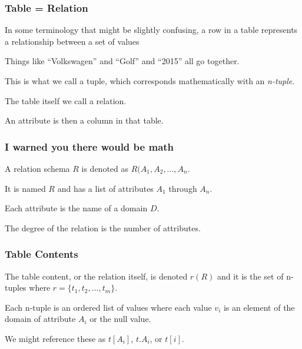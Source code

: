 \begin{frame}
\frametitle{Table = Relation}

In some terminology that might be slightly confusing, a row in a table represents a \alert{relationship} between a set of values 

Things like ``Volkswagen'' and ``Golf'' and ``2015'' all go together. 

This is what we call a \alert{tuple}, which corresponds mathematically with an \textit{n-tuple}.

The table itself we call a \alert{relation}. 

An \alert{attribute} is then a column in that table. 

\end{frame}



\begin{frame}
\frametitle{I warned you there would be math}

A relation schema $R$ is denoted as $R(A_{1}, A_{2}, ..., A_{n}$. 

It is named $R$ and has a list of attributes $A_{1}$ through $A_{n}$. 

Each attribute is the name of a domain $D$. 

The degree of the relation is the number of attributes. 

\end{frame}



\begin{frame}
\frametitle{Table Contents}

The table content, or the relation itself, is denoted $r(R)$ and it is the set of n-tuples where $r = \{t_{1}, t_{2}, ..., t_{m}\}$. 

Each n-tuple is an ordered list of values where each value $v_{i}$ is an element of the domain of attribute $A_{i}$ or the null value. 

We might reference these as $t[A_{i}]$, $t.A_{i}$, or $t[i]$. 

\end{frame}



